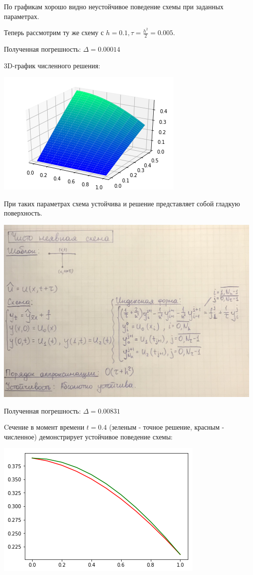 \documentclass{article}%
\begin{document}
\begin{enumerate}
По графикам хорошо видно неустойчивое поведение схемы при заданных параметрах. 

Теперь рассмотрим ту же схему с $h=0.1, \tau=\frac{h^2}{2}=0.005$.

Полученная погрешность: $\Delta = 0.00014$

3D-график численного решения:

\includegraphics[scale=0.7]{output_16_0.png}

При таких параметрах схема устойчива и решение представляет собой гладкую поверхность.

\clearpage

\includegraphics[scale=0.16]{img02.JPG}

Полученная погрешность: $\Delta = 0.00831$

Cечение в момент времени $t=0.4$ (зеленым - точное решение, красным - численное) демонстрирует устойчивое поведение схемы:

\includegraphics[scale=0.7]{output_20_1.png}


\end{enumerate}
\end{document}
